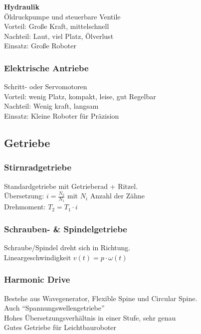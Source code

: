 \textbf{Hydraulik}\\
Öldruckpumpe und steuerbare Ventile\\
Vorteil: Große Kraft, mittelschnell\\
Nachteil: Laut, viel Platz, Ölverlust\\
Einsatz: Große Roboter

\subsubsection{Elektrische Antriebe}%
\label{ts:ssub:elektrische-antriebe}
Schritt- oder Servomotoren\\
Vorteil: wenig Platz, kompakt, leise, gut Regelbar\\
Nachteil: Wenig kraft, langsam\\
Einsatz: Kleine Roboter für Präzision

\newpage
\subsection{Getriebe}%
\label{ts:sub:getriebe}
\subsubsection{Stirnradgetriebe}%
\label{ts:ssub:stirnradgetriebe}
Standardgetriebe mit Getrieberad + Ritzel.\\
Übersetzung: \(i = \frac{N_2}{N_1}\) mit \(N_i\) Anzahl der Zähne\\
Drehmoment: \(T_2 = T_1 \cdot i\)

\subsubsection{Schrauben- \& Spindelgetriebe}%
\label{ts:ssub:schrauben-spindelgetriebe}
Schraube/Spindel dreht sich in Richtung.\\
Lineargeschwindigkeit \(v(t) = p \cdot \omega(t)\)

\subsubsection{Harmonic Drive}%
\label{ts:ssub:harmonic-drive}
Bestehe aus Wavegenerator, Flexible Spine und Circular Spine.\\
Auch \enquote{Spannungswellengetriebe}\\
Hohes Übersetzungsverhältnis in einer Stufe, sehr genau\\
Gutes Getriebe für Leichtbauroboter


